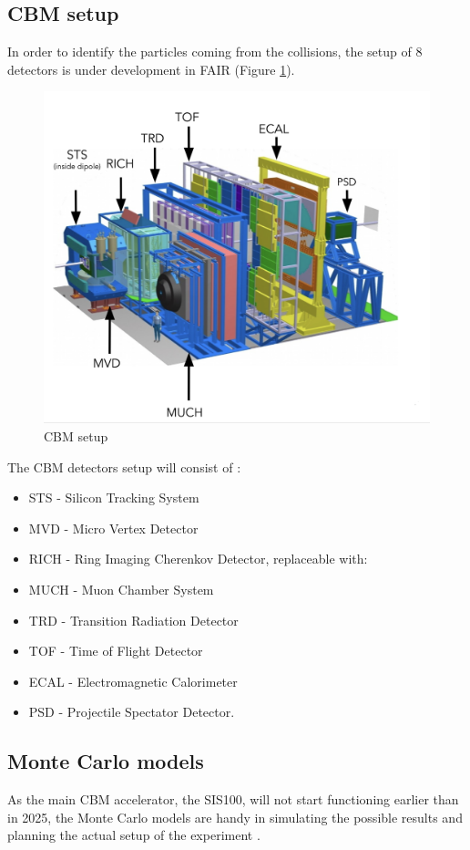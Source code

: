 \subsection{CBM setup}
In order to identify the particles coming from the collisions, the setup of 8 detectors is under development in FAIR (Figure \ref{cbm_setup}).
\begin{figure}[H]
    \centering
    \includegraphics[width=.7\textwidth]{img/cbm_setup.png}
    \caption{CBM setup \cite{progress report}}
    \label{cbm_setup}
\end{figure}
The CBM detectors setup will consist of \cite{progress report}:
\begin{itemize}
    \item STS - Silicon Tracking System
    \item MVD - Micro Vertex Detector
    \item RICH - Ring Imaging Cherenkov Detector, replaceable with:
    \item MUCH - Muon Chamber System
    \item TRD - Transition Radiation Detector
    \item TOF - Time of Flight Detector
    \item ECAL - Electromagnetic Calorimeter
    \item PSD - Projectile Spectator Detector.
\end{itemize}

\subsection{Monte Carlo models}
As the main CBM accelerator, the SIS100, will not start functioning earlier than in 2025, the Monte Carlo models are handy in simulating the possible results and planning the actual setup of the experiment \cite{progress report}.

